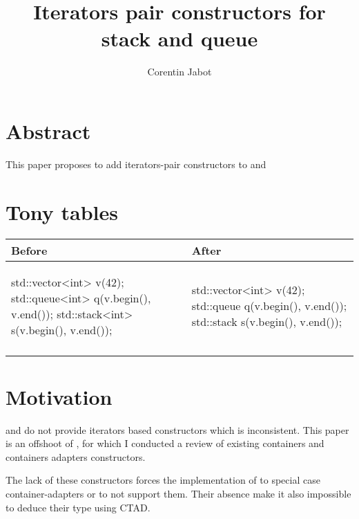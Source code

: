 \documentclass{wg21}
\title{Iterators pair constructors for stack and queue}
\author{Corentin Jabot}{corentin.jabot@gmail.com}
\begin{document}
\maketitle

\section{Abstract}

This paper proposes to add iterators-pair constructors to  and 

\section{Tony tables}
\begin{center}
\begin{tabular}{l|l}
Before & After\\ \hline

\begin{minipage}[t]{0.5\textwidth}
\begin{colorblock}
std::vector<int> v(42);
std::queue<int> q({v.begin(), v.end()});
std::stack<int> s({v.begin(), v.end()});
\end{colorblock}
\end{minipage}
&
\begin{minipage}[t]{0.3\textwidth}
\begin{colorblock}
std::vector<int> v(42);
std::queue q(v.begin(), v.end());
std::stack s(v.begin(), v.end());
\end{colorblock}
\end{minipage}
\\\\ \hline

\end{tabular}
\end{center}


\section{Motivation}

 and  do not provide iterators based constructors which is inconsistent.
This paper is an offshoot of \cite{P1206}, for which I conducted a review of existing containers and containers adapters constructors.

The lack of these constructors forces the implementation of  to special case container-adapters or to not support them.
Their absence make it also impossible to deduce their type using CTAD.
\end{document}
